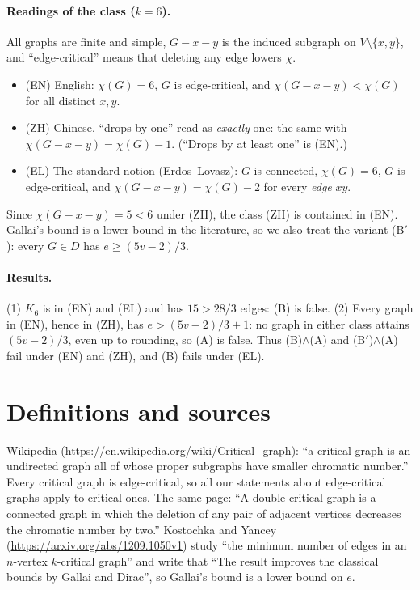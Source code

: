 \documentclass[11pt]{article}
\theoremstyle{definition}
\theoremstyle{remark}
\renewcommand{\_}{\oldus\allowbreak}
\begin{document}
\paragraph{Readings of the class ($k=6$).} All graphs are finite and simple, $G-x-y$ is the induced
subgraph on $V\setminus\{x,y\}$, and ``edge-critical'' means that deleting any edge lowers $\chi$.
\begin{itemize}
  \item (EN) English: $\chi(G)=6$, $G$ is edge-critical, and $\chi(G-x-y)<\chi(G)$ for all distinct $x,y$.
  \item (ZH) Chinese, ``drops by one'' read as \emph{exactly} one: the same with $\chi(G-x-y)=\chi(G)-1$.
        (``Drops by at least one'' is (EN).)
  \item (EL) The standard notion (Erdos--Lovasz): $G$ is connected, $\chi(G)=6$, $G$ is edge-critical, and
        $\chi(G-x-y)=\chi(G)-2$ for every \emph{edge} $xy$.
\end{itemize}
Since $\chi(G-x-y)=5<6$ under (ZH), the class (ZH) is contained in (EN). Gallai's bound is a lower bound
in the literature, so we also treat the variant (B$'$): every $G\in D$ has $e\ge(5v-2)/3$.

\paragraph{Results.} (1) $K_6$ is in (EN) and (EL) and has $15>28/3$ edges: (B) is false. (2) Every graph
in (EN), hence in (ZH), has $e>(5v-2)/3+1$: no graph in either class attains $(5v-2)/3$, even up to
rounding, so (A) is false. Thus (B)$\wedge$(A) and (B$'$)$\wedge$(A) fail under (EN) and (ZH), and (B)
fails under (EL).

\section{Definitions and sources}

Wikipedia (\url{https://en.wikipedia.org/wiki/Critical_graph}): ``a critical graph is an undirected
graph all of whose proper subgraphs have smaller chromatic number.'' Every critical graph is edge-critical,
so all our statements about edge-critical graphs apply to critical ones. The same page: ``A
double-critical graph is a connected graph in which the deletion of any pair of adjacent vertices
decreases the chromatic number by two.'' Kostochka and Yancey (\url{https://arxiv.org/abs/1209.1050v1})
study ``the minimum number of edges in an $n$-vertex $k$-critical graph'' and write that ``The result
improves the classical bounds by Gallai and Dirac'', so Gallai's bound is a lower bound on $e$.
\end{document}
